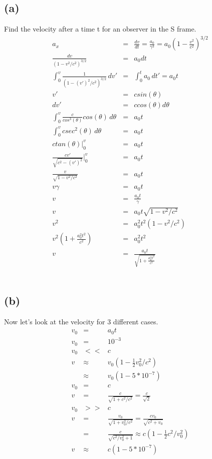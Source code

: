 \documentclass[11pt]{amsart}
\begin{document}
\subsection*{(a)} Find the velocity after a time t for an observer in the S frame. \\
\begin{eqnarray*} 
a_{x} &=& \frac{dv}{dt} =\frac{a_{0}}{\gamma^{3}} = a_{0}(1-\frac{v^{2}}{c^{2}})^{3/2} \\
\frac{dv}{(1-v^{2}/c^{2})^{3/2}} &=& a_{0}dt \\
\int_{0}^{v}\frac{1}{(1-(v')^{2}/c^{2})^{3/2}}\,dv' &=& \int_{0}^{t}a_{0}\,dt' = a_{0}t \\
v' &=& csin(\theta) \\
dv' &=& ccos(\theta)d\theta \\
\int_{0}^{v}\frac{c}{cos^{3}(\theta)}cos(\theta)\,d\theta &=& a_{0}t \\
\int_{0}^{v}csec^{2}(\theta)\,d\theta &=& a_{0}t \\
ctan(\theta)|_{0}^{v} &=& a_{0}t \\
\frac{cv'}{\sqrt{c^{2}-(v')^{2}}}|_{0}^{v} &=& a_{0}t \\
\frac{v}{\sqrt{1-v^{2}/c^{2}}} &=& a_{0}t \\
v\gamma&=& a_{0}t \\
v &=& \frac{a_{0}t}{\gamma} \\
v &=& a_{0}t\sqrt{1-v^{2}/c^{2}} \\
v^{2} &=& a_{0}^{2}t^{2}(1-v^{2}/c^{2}) \\
v^{2}(1+\frac{a_{0}^{2}t^{2}}{c^{2}}) &=& a_{0}^{2}t^{2} \\
v &=& \frac{a_{0}t}{\sqrt{1+\frac{a_{0}^{2}t^{2}}{c^{2}}}} 
\end{eqnarray*} \\
\subsection*{(b)} Now let's look at the velocity for 3 different cases. \\
\begin{eqnarray*}
v_{0} &=& a_{0}t \\
v_{0} &=& 10^{-3} \\
v_{0} &<<& c \\
v &\approx& v_{0}(1-\frac{1}{2}v_{0}^{2}/c^{2}) \\
&\approx& v_{0}(1-5*10^{-7}) \\
v_{0} &=& c \\
v &=& \frac{c}{\sqrt{1+c^{2}/c^{2}}} = \frac{c}{\sqrt{2}} \\
v_{0} &>>& c \\
v &=& \frac{v_{0}}{\sqrt{1+v_{0}^{2}/c^{2}}} = \frac{cv_{0}}{\sqrt{c^{2}+v_{0}}} \\
&=& \frac{c}{\sqrt{c^{2}/v_{0}^{2}+1}} \approx c(1-\frac{1}{2}c^{2}/v_{0}^{2}) \\
v &\approx& c(1-5*10^{-7}) 
\end{eqnarray*} \\
\end{document}
